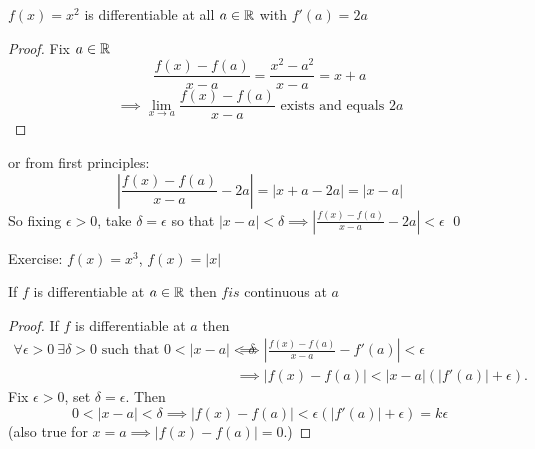 \documentclass[twoside]{scrartcl}
\begin{document}
\begin{center}
\end{center}

\begin{example}
$f(x) = x^2$ is differentiable at all $a \in\mathbb{R}$ with $f'(a) = 2a$
\begin{proof}
Fix $a\in\mathbb{R}$
\[\frac{f(x) -f(a)}{x-a} = \frac{x^2 -a^2}{x-a} = x+a\]
\[\implies \lim_{x\to a} \frac{f(x) -f(a)}{x-a}\text{ exists and equals } 2a\]	
\end{proof}	

or from first principles:
\[\left|\frac{f(x) -f(a)}{x-a}-2a\right| = |x+a-2a| = |x-a|\]
So fixing $\epsilon >0$, take $\delta = \epsilon$ so that $|x-a| < \delta \implies \left|\frac{f(x) -f(a)}{x-a} - 2a\right| < \epsilon$ \qed
\end{example}

Exercise: $f(x) = x^3$, $f(x) = |x|$\\

\begin{proposition}
If $f$ is differentiable at $a\in\mathbb{R}$ then $f is$ continuous at $a$	
\end{proposition}

\begin{proof}[Proof] If $f$ is differentiable at $a$ then
	\[\begin{aligned}\forall \epsilon >0~ \exists \delta  > 0 \text{ such that } 0 < |x-a| < \delta &\implies \left|\frac{f(x) - f(a)}{x-a} - f'(a)\right| < \epsilon \\ 
	&\implies |f(x) - f(a)| < |x-a|(|f'(a)| + \epsilon).	
\end{aligned}
\] 
	Fix $\epsilon > 0$, set $\delta = \epsilon$. Then \[0 < |x-a| < \delta \implies  |f(x) - f(a)| < \epsilon(|f'(a)| + \epsilon) = k\epsilon\] (also true for $x = a \implies |f(x) - f(a)| = 0$.)
\end{proof}
\end{document}
